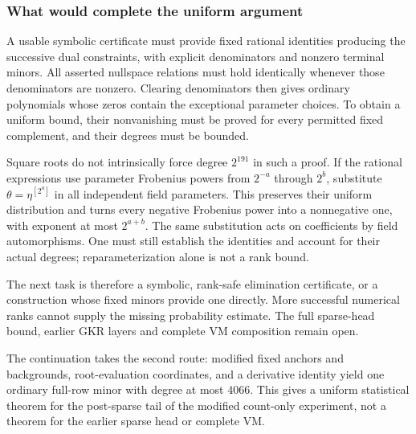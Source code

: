 \subsubsection{What would complete the uniform argument}

A usable symbolic certificate must provide fixed rational identities producing the successive dual constraints, with explicit denominators and nonzero terminal minors. All asserted nullspace relations must hold identically whenever those denominators are nonzero. Clearing denominators then gives ordinary polynomials whose zeros contain the exceptional parameter choices. To obtain a uniform bound, their nonvanishing must be proved for every permitted fixed complement, and their degrees must be bounded.

Square roots do not intrinsically force degree $2^{191}$ in such a proof. If the rational expressions use parameter Frobenius powers from $2^{-a}$ through $2^b$, substitute $\theta=\eta^{[2^a]}$ in all independent field parameters. This preserves their uniform distribution and turns every negative Frobenius power into a nonnegative one, with exponent at most $2^{a+b}$. The same substitution acts on coefficients by field automorphisms. One must still establish the identities and account for their actual degrees; reparameterization alone is not a rank bound.

The next task is therefore a symbolic, rank-safe elimination certificate, or a construction whose fixed minors provide one directly. More successful numerical ranks cannot supply the missing probability estimate. The full sparse-head bound, earlier GKR layers and complete VM composition remain open.

The continuation  takes the second route: modified fixed anchors and backgrounds, root-evaluation coordinates, and a derivative identity yield one ordinary full-row minor with degree at most $4066$. This gives a uniform statistical theorem for the post-sparse tail of the modified count-only experiment, not a theorem for the earlier sparse head or complete VM.

